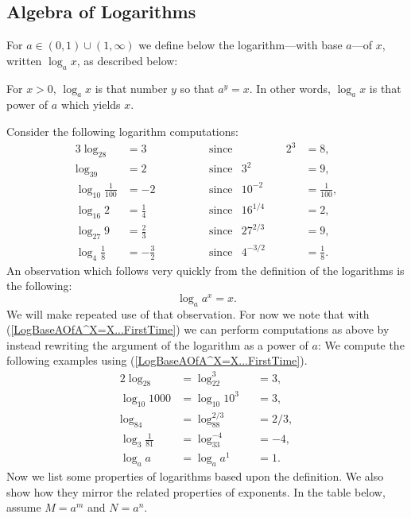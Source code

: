\subsection{Algebra of Logarithms}
For $a\in(0,1)\cup(1,\infty)$ we define below the logarithm---with base
$a$---of $x$, written $\log_ax$, as described below:
\begin{definition} For $x>0$, 
$\log_ax$ is that number $y$ so that $a^y=x$.  In other words,
$\log_ax$ is that power of $a$ which yields $x$.
\end{definition}
\bex Consider the following logarithm computations:
\begin{alignat*}{3}
\log_28&=3\qquad&\qquad &\text{since}&\qquad\qquad2^3&=8,\\
\log_39&=2&&\text{since}&3^2&=9,\\
\log_{10}\frac1{100}&=-2&&\text{since}&10^{-2}&=\frac1{100},\\
\log_{16}2&=\frac14&&\text{since}&16^{1/4}&=2,\\
\log_{27}9&=\frac23&&\text{since}&27^{2/3}&=9,\\
\log_{4}\frac18&=-\frac32&&\text{since}&4^{-3/2}&=\frac18.
\end{alignat*}
\eex
An observation which follows very quickly from the definition
of the logarithms is the following:
\begin{equation}
\log_aa^x=x.\label{LogBaseAOfA^X=X...FirstTime}
\end{equation}
We will make repeated use of that observation.
For now we note that  with (\ref{LogBaseAOfA^X=X...FirstTime})
we can perform computations as above by instead rewriting
the argument of the logarithm as a power of $a$:
\bex We compute the following examples using
(\ref{LogBaseAOfA^X=X...FirstTime}).
\begin{alignat*}{2}
\log_28&=\log_22^3&&=3,\\
\log_{10}1000&=\log_{10}10^3&&=3,\\
\log_84&=\log_88^{2/3}&&=2/3,\\
\log_3\frac1{81}&=\log_33^{-4}&&=-4,\\
\log_aa&=\log_aa^1&&=1.
\end{alignat*}
\eex
Now we list some properties of logarithms based upon
the definition.  We also show how they mirror the related
properties of exponents.  In the table below, assume
$M=a^m$ and $N=a^n.$

